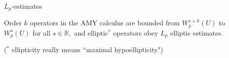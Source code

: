 \documentclass{beamer}
\numberwithin{equation}{section}
\theoremstyle{plain}
\theoremstyle{plain}
\theoremstyle{definition}
\theoremstyle{plain}
\theoremstyle{plain}
\theoremstyle{definition}
\newcommand{\Rl}{\mathbb{R}}
\begin{document}
\begin{frame}{$L_p$-estimates}
  \begin{corollary}
    Order $k$ operators in the AMY calculus are bounded from $W^{s+k}_p(U)$ to $W^s_p(U)$ for all $s \in \Rl,$
    and elliptic$^*$ operators obey $L_p$ elliptic estimates.
  \end{corollary}
  \pause
  ($^*$ ellipticity really means ``maximal hypoellipticity")
\end{frame}

\begin{frame}
\end{frame}
\end{document}
